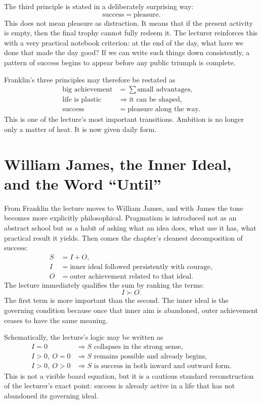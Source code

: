 The third principle is stated in a deliberately surprising way:
\begin{equation}
\text{success}=\text{pleasure}.
\end{equation}
This does not mean pleasure as distraction. It means that if the present activity is empty, then the final trophy cannot fully redeem it. The lecturer reinforces this with a very practical notebook criterion: at the end of the day, what have we done that made the day good? If we can write such things down consistently, a pattern of success begins to appear before any public triumph is complete.

Franklin's three principles may therefore be restated as
\begin{align}
\text{big achievement} &= \sum \text{small advantages},\\
\text{life is plastic} &\Rightarrow \text{it can be shaped},\\
\text{success} &= \text{pleasure along the way}.
\end{align}
This is one of the lecture's most important transitions. Ambition is no longer only a matter of heat. It is now given daily form.

\section{William James, the Inner Ideal, and the Word ``Until''}

From Franklin the lecture moves to William James, and with James the tone becomes more explicitly philosophical. Pragmatism is introduced not as an abstract school but as a habit of asking what an idea does, what use it has, what practical result it yields. Then comes the chapter's cleanest decomposition of success:
\begin{align}
S &= I + O,\\
I &= \text{inner ideal followed persistently with courage},\\
O &= \text{outer achievement related to that ideal}.
\end{align}
The lecture immediately qualifies the sum by ranking the terms:
\begin{equation}
I \succ O.
\end{equation}
The first term is more important than the second. The inner ideal is the governing condition because once that inner aim is abandoned, outer achievement ceases to have the same meaning.

Schematically, the lecture's logic may be written as
\begin{align}
I=0 &\Rightarrow S \text{ collapses in the strong sense},\\
I>0,\ O=0 &\Rightarrow S \text{ remains possible and already begins},\\
I>0,\ O>0 &\Rightarrow S \text{ is success in both inward and outward form}.
\end{align}
This is not a visible board equation, but it is a cautious standard reconstruction of the lecturer's exact point: success is already active in a life that has not abandoned its governing ideal.

